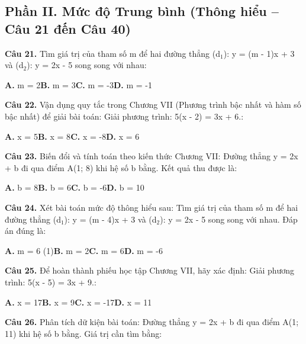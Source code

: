 \documentclass[11pt,a4paper]{article}
\begin{document}
\subsection*{\color{accent} Phần II. Mức độ Trung bình (Thông hiểu -- Câu 21 đến Câu 40)}
\textbf{\color{primary} Câu 21.} Tìm giá trị của tham số m để hai đường thẳng (d$_1$): y = (m - 1)x + 3 và (d$_2$): y = 2x - 5 song song với nhau:\par
\hspace*{1.5em}\textbf{A.} m = 2\quad\quad \textbf{B.} m = 3\quad\quad \textbf{C.} m = -3\quad\quad \textbf{D.} m = -1\par\vspace{2pt}
\textbf{\color{primary} Câu 22.} Vận dụng quy tắc trong Chương VII (Phương trình bậc nhất và hàm số bậc nhất) để giải bài toán: Giải phương trình: 5(x - 2) = 3x + 6.:\par
\hspace*{1.5em}\textbf{A.} x = 5\quad\quad \textbf{B.} x = 8\quad\quad \textbf{C.} x = -8\quad\quad \textbf{D.} x = 6\par\vspace{2pt}
\textbf{\color{primary} Câu 23.} Biến đổi và tính toán theo kiến thức Chương VII: Đường thẳng y = 2x + b đi qua điểm A(1; 8) khi hệ số b bằng. Kết quả thu được là:\par
\hspace*{1.5em}\textbf{A.} b = 8\quad\quad \textbf{B.} b = 6\quad\quad \textbf{C.} b = -6\quad\quad \textbf{D.} b = 10\par\vspace{2pt}
\textbf{\color{primary} Câu 24.} Xét bài toán mức độ thông hiểu sau: Tìm giá trị của tham số m để hai đường thẳng (d$_1$): y = (m - 4)x + 3 và (d$_2$): y = 2x - 5 song song với nhau. Đáp án đúng là:\par
\hspace*{1.5em}\textbf{A.} m = 6 (1)\quad\quad \textbf{B.} m = 2\quad\quad \textbf{C.} m = 6\quad\quad \textbf{D.} m = -6\par\vspace{2pt}
\textbf{\color{primary} Câu 25.} Để hoàn thành phiếu học tập Chương VII, hãy xác định: Giải phương trình: 5(x - 5) = 3x + 9.:\par
\hspace*{1.5em}\textbf{A.} x = 17\quad\quad \textbf{B.} x = 9\quad\quad \textbf{C.} x = -17\quad\quad \textbf{D.} x = 11\par\vspace{2pt}
\textbf{\color{primary} Câu 26.} Phân tích dữ kiện bài toán: Đường thẳng y = 2x + b đi qua điểm A(1; 11) khi hệ số b bằng. Giá trị cần tìm bằng:\par
\end{document}
